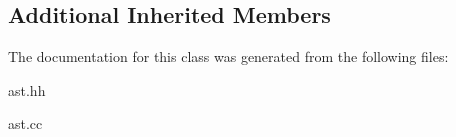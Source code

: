 \subsection*{Additional Inherited Members}


The documentation for this class was generated from the following files\+:\begin{DoxyCompactItemize}
\item 
ast.\+hh\item 
ast.\+cc\end{DoxyCompactItemize}
